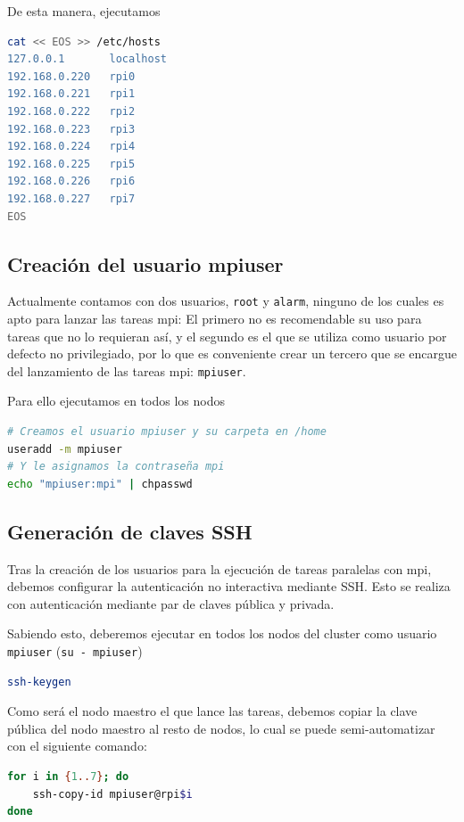 De esta manera, ejecutamos
\begin{lstlisting}[language=bash]
cat << EOS >> /etc/hosts
127.0.0.1       localhost
192.168.0.220   rpi0
192.168.0.221   rpi1
192.168.0.222   rpi2
192.168.0.223   rpi3
192.168.0.224   rpi4
192.168.0.225   rpi5
192.168.0.226   rpi6
192.168.0.227   rpi7
EOS
\end{lstlisting}

\subsection{Creación del usuario mpiuser}
Actualmente contamos con dos usuarios, \texttt{root} y \texttt{alarm}, ninguno de los cuales es apto para lanzar las tareas mpi: El primero no es recomendable su uso para tareas que no lo requieran así, y el segundo es el que se utiliza como usuario por defecto no privilegiado, por lo que es conveniente crear un tercero que se encargue del lanzamiento de las tareas mpi: \texttt{mpiuser}.

Para ello ejecutamos en todos los nodos
\begin{lstlisting}[language=bash]
# Creamos el usuario mpiuser y su carpeta en /home
useradd -m mpiuser
# Y le asignamos la contraseña mpi
echo "mpiuser:mpi" | chpasswd
\end{lstlisting}

\subsection{Generación de claves SSH}
Tras la creación de los usuarios para la ejecución de tareas paralelas con mpi, debemos configurar la autenticación no interactiva mediante SSH. Esto se realiza con autenticación mediante par de claves pública y privada.

Sabiendo esto, deberemos ejecutar en todos los nodos del cluster como usuario \texttt{mpiuser} (\texttt{su - mpiuser})
\begin{lstlisting}[language=bash]
ssh-keygen
\end{lstlisting}

Como será el nodo maestro el que lance las tareas, debemos copiar la clave pública del nodo maestro al resto de nodos, lo cual se puede semi-automatizar con el siguiente comando:

\begin{lstlisting}[language=bash]
for i in {1..7}; do
    ssh-copy-id mpiuser@rpi$i
done
\end{lstlisting}

